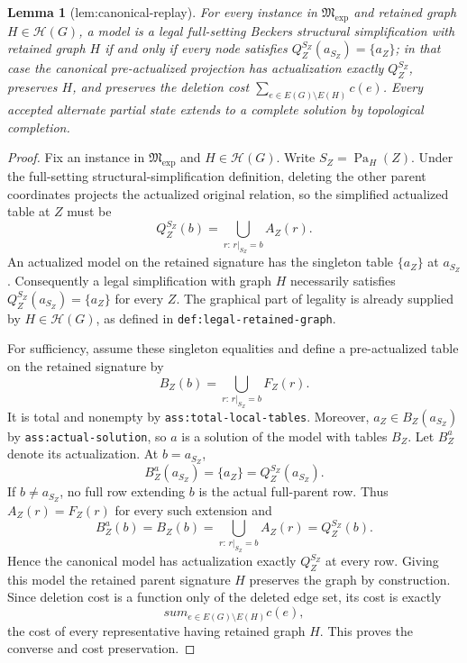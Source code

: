 \documentclass{article}
\newtheorem{lemma}{Lemma}
\begin{document}
\begin{lemma}[lem:canonical-replay]\label{lem:canonical-replay}
For every instance in \(\mathfrak M_{\mathrm{exp}}\) and retained graph \(H\in\mathcal H(G)\), a model is a legal full-setting Beckers structural simplification with retained graph \(H\) if and only if every node satisfies \(Q_Z^{S_Z}(a_{S_Z})=\{a_Z\}\); in that case the canonical pre-actualized projection has actualization exactly \(Q_Z^{S_Z}\), preserves \(H\), and preserves the deletion cost \(\sum_{e\in E(G)\setminus E(H)}c(e)\). Every accepted alternate partial state extends to a complete solution by topological completion.
\end{lemma}
\begin{proof}
Fix an instance in \(\mathfrak M_{\mathrm{exp}}\) and \(H\in\mathcal H(G)\).  Write \(S_Z=\operatorname{Pa}_H(Z)\).  Under the full-setting structural-simplification definition, deleting the other parent coordinates projects the actualized original relation, so the simplified actualized table at \(Z\) must be
\[
 Q_Z^{S_Z}(b)=\bigcup_{r:\,r|_{S_Z}=b}A_Z(r).
\]
An actualized model on the retained signature has the singleton table \(\{a_Z\}\) at \(a_{S_Z}\).  Consequently a legal simplification with graph \(H\) necessarily satisfies \(Q_Z^{S_Z}(a_{S_Z})=\{a_Z\}\) for every \(Z\).  The graphical part of legality is already supplied by \(H\in\mathcal H(G)\), as defined in \texttt{def:legal-retained-graph}.

For sufficiency, assume these singleton equalities and define a pre-actualized table on the retained signature by
\[
 B_Z(b)=\bigcup_{r:\,r|_{S_Z}=b}F_Z(r).
\]
It is total and nonempty by \texttt{ass:total-local-tables}.  Moreover, \(a_Z\in B_Z(a_{S_Z})\) by \texttt{ass:actual-solution}, so \(a\) is a solution of the model with tables \(B_Z\).  Let \(B_Z^a\) denote its actualization.  At \(b=a_{S_Z}\),
\[
 B_Z^a(a_{S_Z})=\{a_Z\}=Q_Z^{S_Z}(a_{S_Z}).
\]
If \(b\ne a_{S_Z}\), no full row extending \(b\) is the actual full-parent row.  Thus \(A_Z(r)=F_Z(r)\) for every such extension and
\[
 B_Z^a(b)=B_Z(b)=\bigcup_{r:\,r|_{S_Z}=b}A_Z(r)=Q_Z^{S_Z}(b).
\]
Hence the canonical model has actualization exactly \(Q_Z^{S_Z}\) at every row.  Giving this model the retained parent signature \(H\) preserves the graph by construction.  Since deletion cost is a function only of the deleted edge set, its cost is exactly
\[
 sum_{e\in E(G)\setminus E(H)}c(e),
\]
the cost of every representative having retained graph \(H\).  This proves the converse and cost preservation.


\end{proof}
\end{document}
